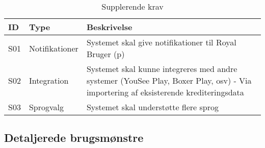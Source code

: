 \begin{table}[h]
\centering
\begin{tabular}{ |p{1cm}|p{2.5cm}|p{12.0cm}| }
\hline
\textbf{ID} & \textbf{Type} & \textbf{Beskrivelse} \\
\hline
S01 & Notifikationer & Systemet skal give notifikationer til Royal Bruger (p) \\
\hline
S02 & Integration & Systemet skal kunne integreres med andre systemer (YouSee Play, Boxer Play, osv) - Via importering af eksisterende krediteringsdata \\
\hline
S03 & Sprogvalg & Systemet skal understøtte flere sprog \\ 
\hline
\end{tabular}
\caption{Supplerende krav}
\label{table:1}
\end{table}


\subsection{Detaljerede brugsmønstre}

